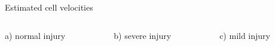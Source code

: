 \documentclass[mathserif,11pt]{beamer}
\begin{document}
\begin{frame}{Estimated cell velocities}
\begin{columns}
	\begin{column}{0.33\textwidth}
		\scalebox{0.7}{}\vfil
		\scalebox{0.7}{}
	\end{column}
	\begin{column}{0.3\textwidth}
		\scalebox{0.7}{}\vfil
		\scalebox{0.7}{}
	\end{column}
	\begin{column}{0.3\textwidth}
		\scalebox{0.7}{}\vfil
		\scalebox{0.7}{}
	\end{column}
\end{columns}
\begin{columns}
	\centering
	\begin{column}{0.33\textwidth}
		\centering
		\footnotesize{ a) normal injury}
	\end{column}
	\begin{column}{0.3\textwidth}
		\centering
		\footnotesize{ b) severe injury}
	\end{column}
	\begin{column}{0.3\textwidth}
		\centering
		\footnotesize{ c) mild injury}
	\end{column}
\end{columns}
\end{frame}
%		
\end{document}
